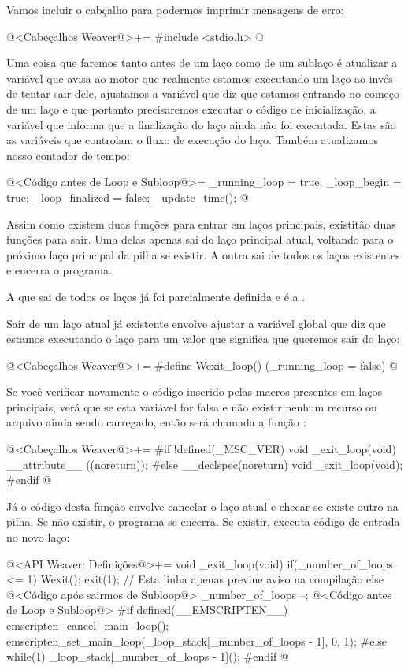Vamos incluir o cabçalho para podermos imprimir mensagens de erro:

@<Cabeçalhos Weaver@>+=
#include <stdio.h>
@

Uma coisa que faremos tanto antes de um laço como de um sublaço é
atualizar a variável  que avisa ao motor
que realmente estamos executando um laço ao invés de tentar sair dele,
ajustamos a variável que diz que estamos entrando no começo de um laço
e que portanto precisaremos executar o código de inicialização, a
variável que informa que a finalização do laço ainda não foi
executada. Estas são as variáveis que controlam o fluxo de execução do
laço. Também atualizamos nosso contador de tempo:

\iniciocodigo
@<Código antes de Loop e Subloop@>=
_running_loop = true;
_loop_begin = true;
_loop_finalized = false;
_update_time();
@
\fimcodigo


Assim como existem duas funções para entrar em laços principais,
existitão duas funções para sair. Uma delas apenas sai do laço
principal atual, voltando para o próximo laço principal da pilha se
existir. A outra sai de todos os laços existentes e encerra o
programa.

A que sai de todos os laços já foi parcialmente definida e é
a .

Sair de um laço atual já existente envolve ajustar a variável global
que diz que estamos executando o laço para um valor que significa que
queremos sair do laço:

\iniciocodigo
@<Cabeçalhos Weaver@>+=
#define Wexit_loop() (_running_loop = false)
@
\fimcodigo

Se você verificar novamente o código inserido pelas macros presentes
em laços principais, verá que se esta variável for falsa e não existir
nenhum recurso ou arquivo ainda sendo carregado, então será chamada a
função :

\iniciocodigo
@<Cabeçalhos Weaver@>+=
#if !defined(_MSC_VER)
void _exit_loop(void) __attribute__ ((noreturn));
#else
__declspec(noreturn) void _exit_loop(void);
#endif
@
\fimcodigo

Já o código desta função envolve cancelar o laço atual e checar se
existe outro na pilha. Se não existir, o programa se encerra. Se
existir, executa código de entrada no novo laço:

\iniciocodigo
@<API Weaver: Definições@>+=
void _exit_loop(void){
  if(_number_of_loops <= 1){
    Wexit();
    exit(1); // Esta linha apenas previne aviso na compilação
  }
  else{
    @<Código após sairmos de Subloop@>
    _number_of_loops --;
    @<Código antes de Loop e Subloop@>
#if defined(__EMSCRIPTEN__)
    emscripten_cancel_main_loop();
    emscripten_set_main_loop(_loop_stack[_number_of_loops - 1], 0, 1);
#else
    while(1)
      _loop_stack[_number_of_loops - 1]();
#endif
  }
}
@
\fimcodigo

